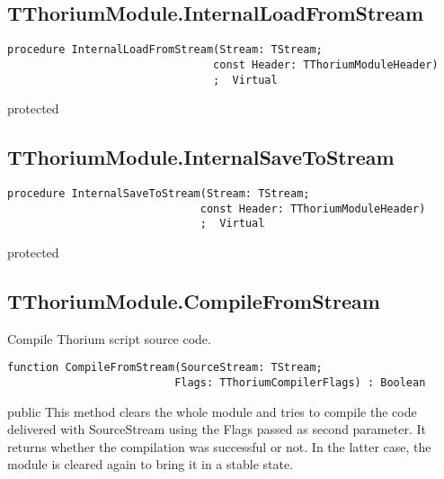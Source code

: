 \subsection{TThoriumModule.InternalLoadFromStream}
\label{thoriumcorepkg:thorium:tthoriummodule:internalloadfromstream}
\begin{FPCList}
\Declaration 

\begin{verbatim}
procedure InternalLoadFromStream(Stream: TStream;
                                const Header: TThoriumModuleHeader)
                                ;  Virtual
\end{verbatim}
\Visibility
protected
\end{FPCList}
\subsection{TThoriumModule.InternalSaveToStream}
\label{thoriumcorepkg:thorium:tthoriummodule:internalsavetostream}
\begin{FPCList}
\Declaration 

\begin{verbatim}
procedure InternalSaveToStream(Stream: TStream;
                              const Header: TThoriumModuleHeader)
                              ;  Virtual
\end{verbatim}
\Visibility
protected
\end{FPCList}
\subsection{TThoriumModule.CompileFromStream}
\label{thoriumcorepkg:thorium:tthoriummodule:compilefromstream}
\begin{FPCList}
\Synopsis
Compile Thorium script source code.\Declaration 

\begin{verbatim}
function CompileFromStream(SourceStream: TStream;
                          Flags: TThoriumCompilerFlags) : Boolean
\end{verbatim}
\Visibility
public
\Description
This method clears the whole module and tries to compile the code delivered with SourceStream using the Flags passed as second parameter. It returns whether the compilation was successful or not. In the latter case, the module is cleared again to bring it in a stable state. \end{FPCList}

